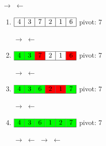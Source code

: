 \documentclass[12pt, letterpaper]{article}
\begin{document}
\begin{minipage}{0.8\textwidth}
	\hspace{1cm}$\rightarrow$
	\hspace{2.4cm}$\leftarrow$
	\begin{enumerate}
		\item 
		$\begin{array}{|l|c|c|c|c|r|}
			\hline
			4 & 3 & 7 & 2 & 1 & 6 \\
			\hline
		\end{array}$
		pivot: 7
		
		\hspace{1.2cm}$\rightarrow$
		\hspace{1.2cm}$\leftarrow$
		
		\item 
		$\begin{array}{|l|c|c|c|c|r|}
			\hline
			\cellcolor{green}{4} & \cellcolor{green}{3} & \cellcolor{red}{7} & 2
			& 1 & \cellcolor{red}{6}\\
			\hline
		\end{array}$
		pivot: 7
		
		\hspace{1.8cm}$\rightarrow$
		\hspace{0.02cm}$\leftarrow$
		
		\item
		$\begin{array}{|l|c|c|c|c|r|}
			\hline
			\cellcolor{green}{4} & \cellcolor{green}{3} & \cellcolor{green}{6} &
			\cellcolor{red}{2} & \cellcolor{red}{1} & \cellcolor{green}{7}\\
			\hline
		\end{array}$
		pivot: 7
		
		\hspace{1.8cm}$\rightarrow$
		\hspace{0.02cm}$\leftarrow$
		
		\item
		$\begin{array}{|l|c|c|c|c|r|}
			\hline
			\cellcolor{green}{4} & \cellcolor{green}{3} & \cellcolor{green}{6} &
			\cellcolor{green}{1} & \cellcolor{green}{2} & \cellcolor{green}{7}\\
			\hline
		\end{array}$
		pivot: 7
				
		$\rightarrow$
		\hspace{1.2cm}$\leftarrow$
		\hspace{1.75cm}$\rightarrow$
		\hspace{0.02cm}$\leftarrow$
		

\end{enumerate}
\end{minipage}
\end{document}
